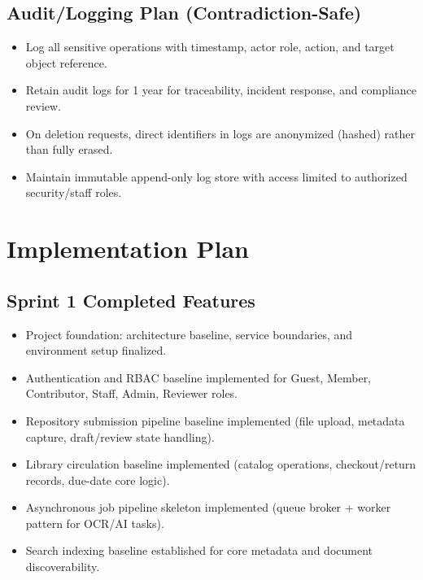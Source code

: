 \documentclass[12pt,a4paper]{article}
\begin{document}
\subsection*{Audit/Logging Plan (Contradiction-Safe)}
\begin{itemize}
    \item Log all sensitive operations with timestamp, actor role, action, and target object reference.
    \item Retain audit logs for 1 year for traceability, incident response, and compliance review.
    \item On deletion requests, direct identifiers in logs are anonymized (hashed) rather than fully erased.
    \item Maintain immutable append-only log store with access limited to authorized security/staff roles.
\end{itemize}

\section{Implementation Plan}
\subsection*{Sprint 1 Completed Features}
\begin{itemize}
    \item Project foundation: architecture baseline, service boundaries, and environment setup finalized.
    \item Authentication and RBAC baseline implemented for Guest, Member, Contributor, Staff, Admin, Reviewer roles.
    \item Repository submission pipeline baseline implemented (file upload, metadata capture, draft/review state handling).
    \item Library circulation baseline implemented (catalog operations, checkout/return records, due-date core logic).
    \item Asynchronous job pipeline skeleton implemented (queue broker + worker pattern for OCR/AI tasks).
    \item Search indexing baseline established for core metadata and document discoverability.
\end{itemize}
\end{document}
